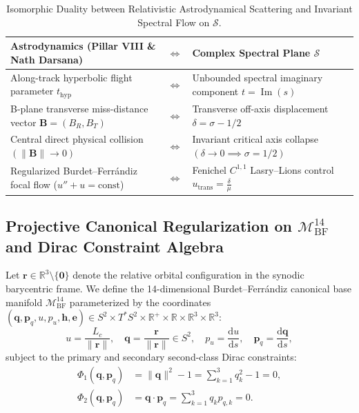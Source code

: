 \documentclass[11pt,a4paper,reqno]{article}
\theoremstyle{plain}
\theoremstyle{definition}
\theoremstyle{remark}
\numberwithin{equation}{section}
\providecommand{\diff}{\mathrm{d}}
\begin{document}
\begin{table}[H]
\centering
\small
\caption{Isomorphic Duality between Relativistic Astrodynamical Scattering and Invariant Spectral Flow on $\mathcal{S}$.}
\label{tab:bplane_spectral_duality}
\vspace{0.4em}
\begin{tabularx}{\textwidth}{@{}p{6.8cm} c Y@{}}
\toprule
\textbf{Astrodynamics (Pillar VIII \& Nath Darsana)} & $\Longleftrightarrow$ & \textbf{Complex Spectral Plane } $\mathcal{S}$ \\
\midrule
Along-track hyperbolic flight parameter $t_{\mathrm{hyp}}$ & $\Longleftrightarrow$ & Unbounded spectral imaginary component $t = \operatorname{Im}(s)$ \\
B-plane transverse miss-distance vector $\bm{B} = (B_R, B_T)$ & $\Longleftrightarrow$ & Transverse off-axis displacement $\delta = \sigma - 1/2$ \\
Central direct physical collision $(\|\bm{B}\| \to 0)$ & $\Longleftrightarrow$ & Invariant critical axis collapse $(\delta \to 0 \implies \sigma = 1/2)$ \\
Regularized Burdet--Ferr\'{a}ndiz focal flow ($u'' + u = \text{const}$) & $\Longleftrightarrow$ & Fenichel $C^{1,1}$ Lasry--Lions control $u_{\mathrm{trans}} = \frac{\delta}{\mu}$ \\
\bottomrule
\end{tabularx}
\end{table}

\subsection{Projective Canonical Regularization on \texorpdfstring{$\mathcal{M}_{\mathrm{BF}}^{14}$}{M BF 14} and Dirac Constraint Algebra}
Let $\mathbf{r} \in \mathbb{R}^3 \setminus \{\mathbf{0}\}$ denote the relative orbital configuration in the synodic barycentric frame. We define the 14-dimensional Burdet--Ferr\'andiz canonical base manifold $\mathcal{M}_{\mathrm{BF}}^{14}$ parameterized by the coordinates $(\mathbf{q}, \mathbf{p}_q, u, p_u, \mathbf{h}, \mathbf{e}) \in S^2 \times T^* S^2 \times \mathbb{R}^+ \times \mathbb{R} \times \mathbb{R}^3 \times \mathbb{R}^3$:
\begin{equation}
\label{eq:bf_coordinates}
u = \frac{L_c}{\|\mathbf{r}\|}, \quad \mathbf{q} = \frac{\mathbf{r}}{\|\mathbf{r}\|} \in S^2, \quad p_u = \frac{\diff u}{\diff s}, \quad \mathbf{p}_q = \frac{\diff\mathbf{q}}{\diff s},
\end{equation}
subject to the primary and secondary second-class Dirac constraints:
\begin{align}
\label{eq:dirac_constraints}
\Phi_1(\mathbf{q}, \mathbf{p}_q) &= \|\mathbf{q}\|^2 - 1 = \sum_{k=1}^3 q_k^2 - 1 = 0, \\
\Phi_2(\mathbf{q}, \mathbf{p}_q) &= \mathbf{q} \cdot \mathbf{p}_q = \sum_{k=1}^3 q_k p_{q,k} = 0.
\end{align}
\end{document}
